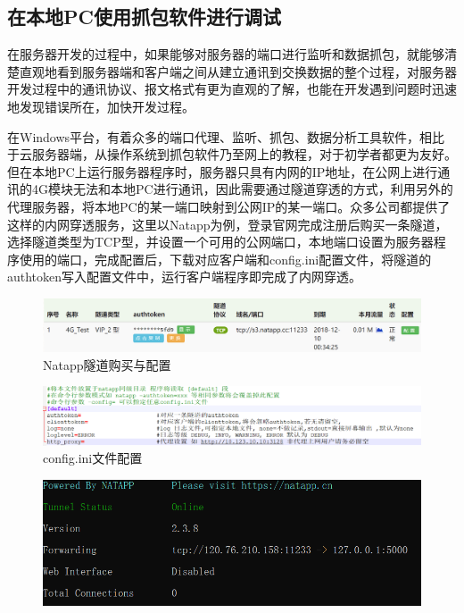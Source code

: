 \documentclass[a4paper,11pt]{ctexart}
\begin{document}
\begin{spacing}{1.5}
\section{在本地PC使用抓包软件进行调试}
\par
在服务器开发的过程中，如果能够对服务器的端口进行监听和数据抓包，就能够清楚直观地看到服务器端和客户端之间从建立通讯到交换数据的整个过程，对服务器开发过程中的通讯协议、报文格式有更为直观的了解，也能在开发遇到问题时迅速地发现错误所在，加快开发过程。
\par
在Windows平台，有着众多的端口代理、监听、抓包、数据分析工具软件，相比于云服务器端，从操作系统到抓包软件乃至网上的教程，对于初学者都更为友好。但在本地PC上运行服务器程序时，服务器只具有内网的IP地址，在公网上进行通讯的4G模块无法和本地PC进行通讯，因此需要通过隧道穿透的方式，利用另外的代理服务器，将本地PC的某一端口映射到公网IP的某一端口。众多公司都提供了这样的内网穿透服务，这里以Natapp为例，登录官网完成注册后购买一条隧道，选择隧道类型为TCP型，并设置一个可用的公网端口，本地端口设置为服务器程序使用的端口，完成配置后，下载对应客户端和config.ini配置文件，将隧道的authtoken写入配置文件中，运行客户端程序即完成了内网穿透。
\begin{figure}[h]
	\centering
	\setlength{\abovecaptionskip}{2mm}
	\setlength{\belowcaptionskip}{-2mm}
	\includegraphics[scale=0.25]{隧道1.png}
	\caption{Natapp隧道购买与配置}\label{figure:隧道1}
\end{figure}
\begin{figure}[h]
	\centering
	\setlength{\abovecaptionskip}{2mm}
	\setlength{\belowcaptionskip}{-2mm}
	\includegraphics[scale=0.4]{隧道2.png}
	\caption{config.ini文件配置}\label{figure:隧道2}
\end{figure}
\begin{figure}[h]
	\centering
	\setlength{\abovecaptionskip}{2mm}
	\setlength{\belowcaptionskip}{-2mm}
	\includegraphics[scale=0.4]{隧道3.png}

\end{figure}
\end{spacing}
\end{document}
